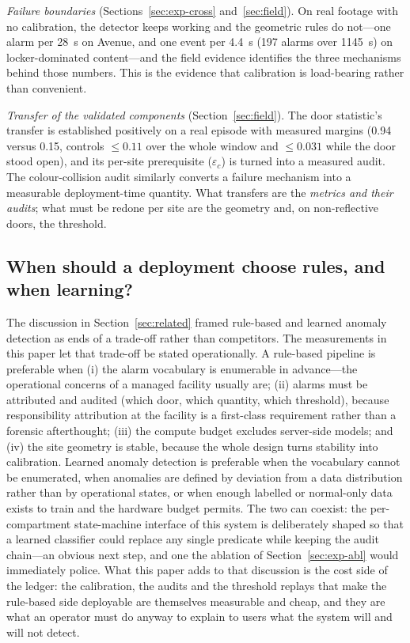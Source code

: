 \documentclass[journal,article,submit,oneauthor]{Definitions/mdpi}
\begin{document}
\emph{Failure boundaries} (Sections~\ref{sec:exp-cross} and~\ref{sec:field}). On real footage with no calibration, the detector keeps
working and the geometric rules do not---one alarm per 28~s on Avenue, and one event per
4.4~s (197 alarms over 1145~s) on locker-dominated content---and the field evidence identifies
the three mechanisms behind
those numbers. This is the evidence that calibration is load-bearing rather than
convenient.

\emph{Transfer of the validated components} (Section~\ref{sec:field}). The door statistic's transfer is
established positively on a real episode with measured margins (0.94 versus 0.15, controls
$\le 0.11$ over the whole window and $\le 0.031$ while the door stood open), and its per-site
prerequisite ($\varepsilon_c$) is turned into a measured
audit. The colour-collision audit similarly converts a failure mechanism into a measurable
deployment-time quantity. What transfers are the \emph{metrics and their audits}; what must
be redone per site are the geometry and, on non-reflective doors, the threshold.

\subsection{When should a deployment choose rules, and when learning?}
The discussion in Section~\ref{sec:related} framed rule-based and learned anomaly detection
as ends of a trade-off rather than competitors. The measurements in this paper let that
trade-off be stated operationally. A rule-based pipeline is preferable when (i) the alarm
vocabulary is enumerable in advance---the operational concerns of a managed facility
usually are; (ii) alarms must be attributed and audited (which door, which quantity, which
threshold), because responsibility attribution at the facility is a first-class
requirement rather than a forensic afterthought; (iii) the compute budget excludes
server-side models; and (iv) the site geometry is stable, because the whole design turns
stability into calibration. Learned anomaly detection is preferable when the vocabulary
cannot be enumerated, when anomalies are defined by deviation from a data distribution
rather than by operational states, or when enough labelled or normal-only data exists to
train and the hardware budget permits. The two can coexist: the per-compartment
state-machine interface of this system is deliberately shaped so that a learned classifier
could replace any single predicate while keeping the audit chain---an obvious next step,
and one the ablation of Section~\ref{sec:exp-abl} would immediately police. What this paper adds to that
discussion is the cost side of the ledger: the calibration, the audits and the threshold
replays that make the rule-based side deployable are themselves measurable and cheap, and
they are what an operator must do anyway to explain to users what the system will and will
not detect.
\end{document}
